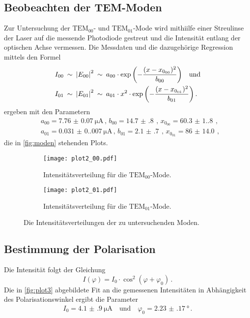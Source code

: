\subsection{Beobeachten der TEM-Moden} \label{sec:moden}
Zur Untersuchung der $\text{TEM}_{00}$- und $\text{TEM}_{01}$-Mode wird mithiilfe einer Streulinse
der Laser auf die messende Photodiode gestreut und die Intensität entlang der optischen Achse vermessen.
Die Messdaten und die dazugehörige Regression mittels den Formel
\begin{align}\label{eq:gauss}
    & I_{00} \: \sim \: {\lvert E_{00}\rvert}^2 \: \sim \: a_{00} \cdot           \exp{\left(-\frac{{(x-x_{0_{00}})^2}}{b_{00}}\right)} \quad \text{und} \\
    & I_{01} \: \sim \: {\lvert E_{01}\rvert}^2 \: \sim \: a_{01} \cdot x^2 \cdot \exp{\left(-\frac{{(x-x_{0_{01}})^2}}{b_{01}}\right)} \, .
\end{align}
ergeben mit den Parametern
\begin{align}
    & a_{00} = \qty{7.76(7)}{\micro\ampere} \, , \, b_{00} = \qty{14.7(8)}{} \, , \, x_{0_{00}} = \qty{60.3(1.8)}{} \, , \\
    & a_{01} = \qty{0.031(0.007)}{\micro\ampere} \, , \, b_{01} = \qty{2.1(7)}{} \, , \, x_{0_{01}} = \qty{86(14.0)}{} \, ,
\end{align}
die in \autoref{fig:moden} stehenden Plots.
\begin{figure}[H]
    \centering
    
    \begin{subfigure}{0.7\columnwidth}
        \centering
        \texttt{[image: plot2\_00.pdf]}
        \caption{Intensitätsverteilung für die $\text{TEM}_{00}$-Mode.}
        \label{fig:tem00}
    \end{subfigure}\hfill

    \begin{subfigure}{0.7\columnwidth}
        \centering
        \texttt{[image: plot2\_01.pdf]}
        \caption{Intensitätsverteilung für die $\text{TEM}_{01}$-Mode.}
        \label{fig:tem01}
    \end{subfigure}
  
    \caption{Die Intensitätsverteilungen der zu untersuchenden Moden.}
    \label{fig:moden}
  
\end{figure}


\subsection{Bestimmung der Polarisation} \label{sec:polarisation}
Die Intensität folgt der Gleichung
\begin{equation}
    I(\varphi)=I_0 \cdot \cos ^2 \left(\varphi+\varphi_0\right) \, .
\end{equation}
Die in \autoref{fig:plot3} abgebildete Fit an die gemessenen Intensitäten in Abhängigkeit des Polarisationswinkel ergibt die Parameter
\begin{align*}
    I_0 = \qty{4.1(9)}{\micro\ampere} \quad \text{und} \quad \varphi_0 = \qty{2.23(17)}{\degree} \, .
\end{align*}

